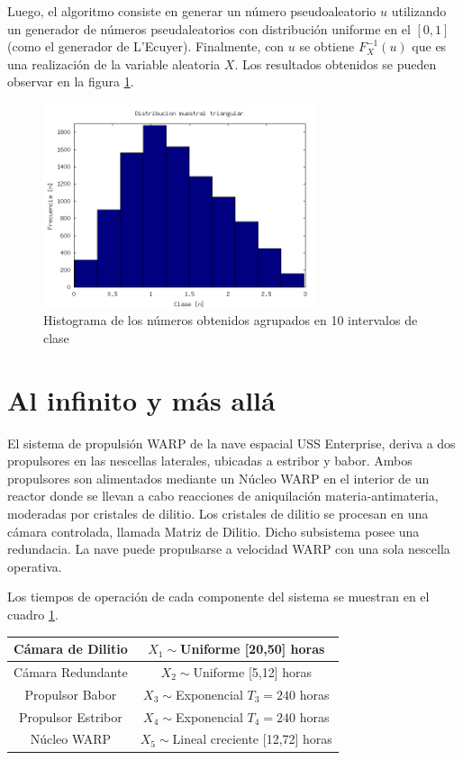 \documentclass{sig-alternate}
\begin{document}
Luego, el algoritmo consiste en generar un n\'umero pseudoaleatorio $u$ utilizando
un generador de n\'umeros pseudaleatorios con distribuci\'on uniforme en el $[0,1]$ (como el generador de L'Ecuyer).
Finalmente, con $u$ se obtiene $F^{-1}_{X}(u)$ que es una realizaci\'on de la variable aleatoria $X$.
Los resultados obtenidos se pueden observar en la figura \ref{fig:triangle}.

\begin{figure}[ht]
\label{fig:triangle}
\includegraphics[width=8cm]{histograma_triangular}
\caption{Histograma de los n\'umeros obtenidos agrupados en 10 intervalos de clase}
\end{figure}

\section{Al infinito y m\'as all\'a}
\label{sec:buzzlightyear}

El sistema de propulsi\'on WARP de la nave espacial USS Enterprise,
deriva a dos propulsores en las nescellas laterales, ubicadas a
estribor y babor. Ambos propulsores son alimentados mediante un
N\'ucleo WARP en el interior de un reactor donde se llevan a
cabo reacciones de aniquilaci\'on materia-antimateria, moderadas
por cristales de dilitio. Los cristales de dilitio se procesan en
una c\'amara controlada, llamada Matriz de Dilitio.
Dicho subsistema posee una redundacia. La nave puede propulsarse
a velocidad WARP con una sola nescella operativa.

Los tiempos de operaci\'on de cada componente del sistema se muestran
en el cuadro \ref{tab:components}.

\begin{table}
\label{tab:components}
\centering
\begin{tabular}{|c|c|}
\hline
  C\'amara de Dilitio & $X_{1}\sim$Uniforme [20,50] horas \\
\hline
  C\'amara Redundante & $X_{2}\sim$Uniforme [5,12] horas \\
\hline
  Propulsor Babor & $X_{3}\sim$Exponencial $T_{3}=240$ horas \\
\hline
  Propulsor Estribor & $X_{4}\sim$Exponencial $T_{4}=240$ horas \\
\hline
  N\'ucleo WARP & $X_{5}\sim$Lineal creciente [12,72] horas \\
\hline
\end{tabular}
\end{table}
\end{document}

